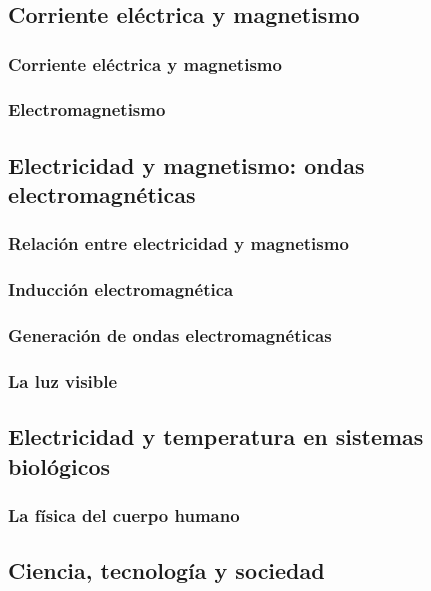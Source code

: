 \documentclass[11pt]{book}
\begin{document}
\chapter{}

\section{Corriente el\'ectrica y magnetismo}
\subsection{Corriente el\'ectrica y magnetismo}
\subsection{Electromagnetismo}

\section{Electricidad y magnetismo: ondas electromagn\'eticas}
\subsection{Relaci\'on entre electricidad y magnetismo}
\subsection{Inducci\'on electromagn\'etica}
\subsection{Generaci\'on de ondas electromagn\'eticas}
\subsection{La luz visible}

\section{Electricidad y temperatura en sistemas biol\'ogicos}
\subsection{La f\'isica del cuerpo humano}

\section{Ciencia, tecnolog\'ia y sociedad}
\end{document}
